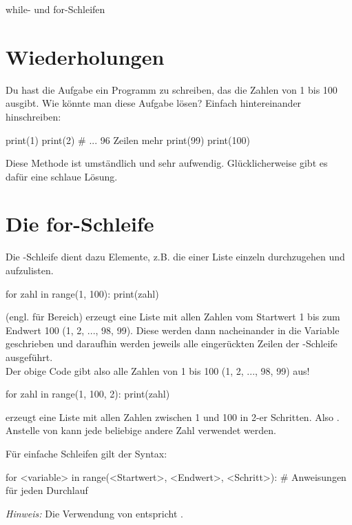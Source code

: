 \documentclass{\VorlagenPfad/coderdojokatext}
\newcommand{\Titel}{while- und for-Schleifen}
\begin{document}
\begin{center}
	{\huge \Titel}
\end{center}

\section{Wiederholungen} Du hast die Aufgabe ein Programm zu schreiben, das die Zahlen von 1 bis 100 ausgibt. Wie könnte man diese Aufgabe lösen? Einfach hintereinander hinschreiben:

\begin{pythoncode}
print(1)
print(2)
# ... 96 Zeilen mehr
print(99)
print(100)
\end{pythoncode}

Diese Methode ist umständlich und sehr aufwendig. Glücklicherweise gibt es dafür eine schlaue Lösung.

\section{Die for-Schleife} Die -Schleife dient dazu Elemente, z.B. die einer Liste einzeln durchzugehen und aufzulisten.

\begin{pythoncode}
for zahl in range(1, 100):
	print(zahl)
\end{pythoncode}

 (engl. für Bereich) erzeugt eine Liste mit allen Zahlen vom Startwert 1 bis zum Endwert 100 (1, 2, ..., 98, 99). Diese werden dann nacheinander in die Variable  geschrieben und daraufhin werden jeweils alle eingerückten Zeilen der -Schleife ausgeführt.\\
Der obige Code gibt also alle Zahlen von 1 bis 100 (1, 2, ..., 98, 99) aus!

\begin{pythoncode}
for zahl in range(1, 100, 2):
	print(zahl)
\end{pythoncode}
 erzeugt eine Liste mit allen Zahlen zwischen 1 und 100 in 2-er Schritten. Also . Anstelle von  kann jede beliebige andere Zahl verwendet werden.

\begin{merkbox}
Für einfache Schleifen gilt der Syntax:
\begin{pythoncode}
for <variable> in range(<Startwert>, <Endwert>, <Schritt>):
	# Anweisungen für jeden Durchlauf
\end{pythoncode}
\emph{Hinweis:} Die Verwendung von  entspricht .
\end{merkbox}
\end{document}
